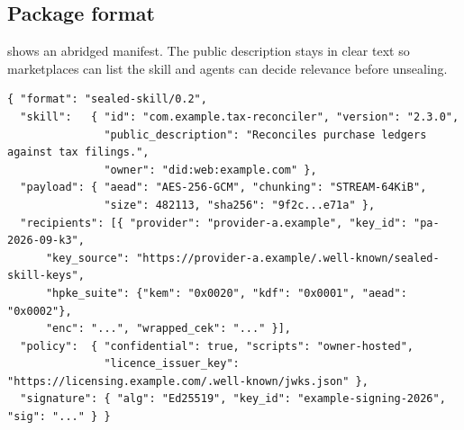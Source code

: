 \subsection{Package format}
 shows an abridged manifest. The public description stays in clear text so
marketplaces can list the skill and agents can decide relevance before unsealing.

\begin{lstlisting}[caption={Abridged \texttt{manifest.json} (format \texttt{sealed-skill/0.2}).},label={lst:manifest},float=t]
{ "format": "sealed-skill/0.2",
  "skill":   { "id": "com.example.tax-reconciler", "version": "2.3.0",
               "public_description": "Reconciles purchase ledgers against tax filings.",
               "owner": "did:web:example.com" },
  "payload": { "aead": "AES-256-GCM", "chunking": "STREAM-64KiB",
               "size": 482113, "sha256": "9f2c...e71a" },
  "recipients": [{ "provider": "provider-a.example", "key_id": "pa-2026-09-k3",
      "key_source": "https://provider-a.example/.well-known/sealed-skill-keys",
      "hpke_suite": {"kem": "0x0020", "kdf": "0x0001", "aead": "0x0002"},
      "enc": "...", "wrapped_cek": "..." }],
  "policy":  { "confidential": true, "scripts": "owner-hosted",
               "licence_issuer_key": "https://licensing.example.com/.well-known/jwks.json" },
  "signature": { "alg": "Ed25519", "key_id": "example-signing-2026", "sig": "..." } }
\end{lstlisting}
